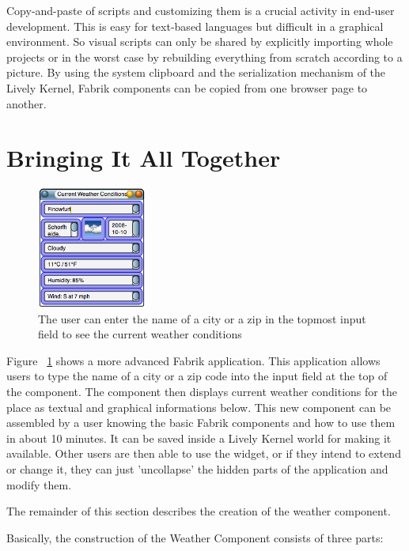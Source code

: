 \documentclass[pdftex, times, 10pt, twocolumn]{article}
\begin{document}
Copy-and-paste of scripts and customizing them is a crucial activity in end-user development.  This is easy for text-based languages but difficult in a graphical environment.  So visual scripts can only be shared by explicitly importing whole projects or in the worst case by rebuilding everything from scratch according to a picture.  By using the system clipboard and the serialization mechanism of the Lively Kernel, Fabrik components can be copied from one browser page to another. 



\section{Bringing It All Together}


\begin{figure}[h]\centering
\includegraphics[width=0.320000\textwidth]{weatherExample03.png} 

\caption{The user can enter the name of a city or a zip in the topmost input field to see the current weather conditions }
\label{fig:WeatherExample}
\end{figure}
Figure ~\ref{fig:WeatherExample} shows a more advanced Fabrik application. This application allows users to type the name of a city or a zip code into the input field at the top of the component. The component then displays current weather conditions for the place as textual and graphical informations below. This new component can be assembled by a user knowing the basic Fabrik components and how to use them in about 10 minutes. It can be saved inside a Lively Kernel world for making it available. Other users are then able to use the widget, or if they intend to extend or change it, they can just 'uncollapse' the hidden parts of the application and modify them. 

The remainder of this section describes the creation of the weather component. 

Basically, the construction of the Weather Component consists of three parts: 
\end{document}
